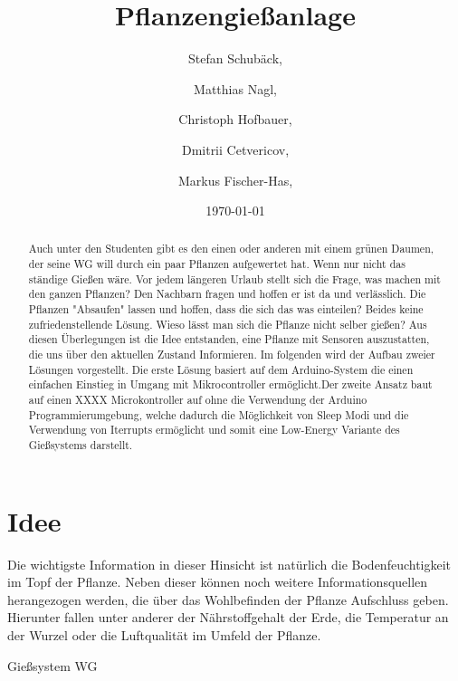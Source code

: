 ﻿\documentclass[]{IEEEtran}
\title{Pflanzengießanlage}
\date{\today}
\author{ Stefan Schubäck, \and Matthias Nagl,\and Christoph Hofbauer, \and Dmitrii Cetvericov, \and Markus Fischer-Has,}
\begin{document}
	\maketitle

\begin{abstract}
Auch unter den Studenten gibt es den einen oder anderen mit einem grünen Daumen, der seine WG will durch ein paar Pflanzen aufgewertet hat. Wenn nur nicht das ständige Gießen wäre. Vor jedem längeren Urlaub stellt sich die Frage, was machen mit den ganzen Pflanzen? Den Nachbarn fragen und hoffen er ist da und verlässlich. Die Pflanzen "Absaufen" lassen und hoffen, dass die sich das was einteilen? Beides keine zufriedenstellende Lösung. Wieso lässt man sich die Pflanze nicht selber gießen?
Aus diesen Überlegungen ist die Idee entstanden, eine Pflanze mit Sensoren auszustatten, die uns über den aktuellen Zustand Informieren. Im folgenden wird der Aufbau zweier Lösungen vorgestellt. Die erste Lösung basiert auf dem Arduino-System die einen einfachen Einstieg in Umgang mit Mikrocontroller ermöglicht.Der zweite Ansatz baut auf einen XXXX Microkontroller auf ohne die Verwendung der Arduino Programmierumgebung, welche dadurch die Möglichkeit von Sleep Modi und die Verwendung von Iterrupts ermöglicht und somit eine Low-Energy Variante des Gießsystems darstellt.  

\end{abstract}
\section{Idee}\label{refIdee}

 Die wichtigste Information in dieser Hinsicht ist natürlich die Bodenfeuchtigkeit im Topf der Pflanze. Neben dieser können noch weitere Informationsquellen herangezogen werden, die über das Wohlbefinden der Pflanze Aufschluss geben. Hierunter fallen unter anderer der Nährstoffgehalt der Erde, die Temperatur an der Wurzel oder die Luftqualität im Umfeld der Pflanze.

Gießsystem WG
\end{document}
